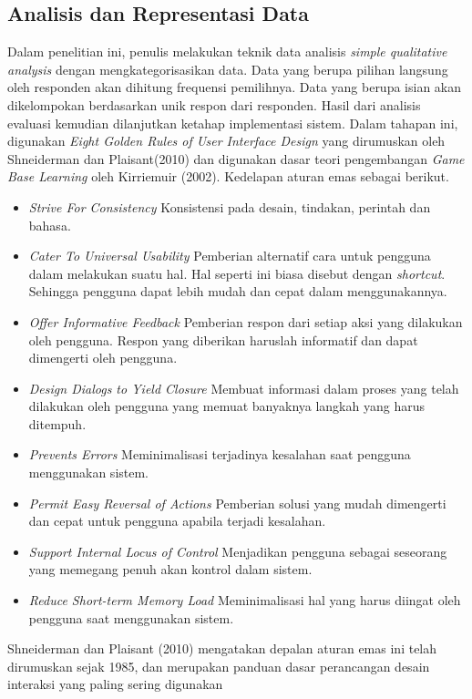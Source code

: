 \subsection{Analisis dan Representasi Data}

Dalam penelitian ini, penulis melakukan teknik data analisis \textit{simple qualitative analysis} dengan mengkategorisasikan data. Data yang berupa pilihan langsung oleh responden akan dihitung frequensi pemilihnya. Data yang berupa isian akan dikelompokan berdasarkan unik respon dari responden. 
\linebreak\linebreak
Hasil dari analisis evaluasi kemudian dilanjutkan ketahap implementasi sistem. Dalam tahapan ini, digunakan \textit{Eight Golden Rules of User Interface Design} yang dirumuskan oleh Shneiderman dan Plaisant(2010) dan digunakan dasar teori pengembangan \textit{Game Base Learning} oleh Kirriemuir (2002).
\linebreak\linebreak
Kedelapan aturan emas sebagai berikut.
\begin{itemize}
	\item \textit{Strive For Consistency}
	\subitem Konsistensi pada desain, tindakan, perintah dan bahasa.
	\item \textit{Cater To Universal Usability}
	\subitem Pemberian alternatif cara untuk pengguna dalam melakukan suatu hal. Hal seperti ini biasa disebut dengan \textit{shortcut}. Sehingga pengguna dapat lebih mudah dan cepat dalam menggunakannya.
	\item \textit{Offer Informative Feedback}
	\subitem Pemberian respon dari setiap aksi yang dilakukan oleh pengguna. Respon yang diberikan haruslah informatif dan dapat dimengerti oleh pengguna.
	\item \textit{Design Dialogs to Yield Closure}
	\subitem Membuat informasi dalam proses yang telah dilakukan oleh pengguna yang memuat banyaknya langkah yang harus ditempuh.
	\item \textit{Prevents Errors}
	\subitem Meminimalisasi terjadinya kesalahan saat pengguna menggunakan sistem.
	\item \textit{Permit Easy Reversal of Actions}
	\subitem Pemberian solusi yang mudah dimengerti dan cepat untuk pengguna apabila terjadi kesalahan.
	\item \textit{Support Internal Locus of Control}
	\subitem Menjadikan pengguna sebagai seseorang yang memegang penuh akan kontrol dalam sistem.
	\item \textit{Reduce Short-term Memory Load}
	\subitem Meminimalisasi hal yang harus diingat oleh pengguna saat menggunakan sistem.
\end{itemize}
Shneiderman dan Plaisant (2010) mengatakan depalan aturan emas ini telah dirumuskan sejak 1985, dan merupakan panduan dasar perancangan desain interaksi yang paling sering digunakan

